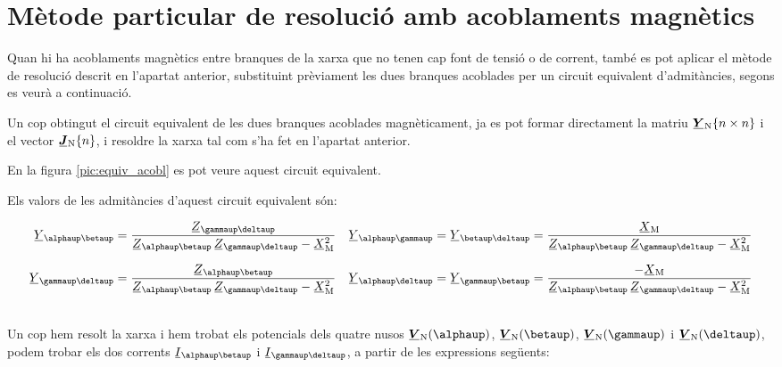 \section{Mètode particular de resolució amb acoblaments magnètics}

Quan hi ha acoblaments magnètics entre branques de la xarxa que no
tenen cap font de tensió o de corrent, també es pot aplicar el
mètode de resolució descrit en l'apartat anterior, substituint
prèviament les dues branques acoblades per un circuit equivalent
d'admitàncies, segons es veurà a continuació. 

Un cop obtingut el circuit equivalent de les dues branques acoblades
magnèticament, ja es pot formar directament la matriu $\mcmplx{Y}\ped{N}\{n \times n\}$ i
el vector $\mcmplx{J}\ped{N}\{n\}$, i  resoldre la xarxa tal com s'ha fet en
l'apartat anterior.

En la figura \vref{pic:equiv_acobl} es pot veure aquest circuit
equivalent.
\begin{center}
\centering
   
    \label{pic:equiv_acobl}
\end{center}

Els valors de les admitàncies d'aquest circuit equivalent
són:

\parbox{15cm}
{ \begin{align*}
   \cmplx{Y}_{\alphaup\betaup} &= \frac{\cmplx{Z}_{\gammaup\deltaup}}{\cmplx{Z}_{\alphaup\betaup}\, \cmplx{Z}_{\gammaup\deltaup}-\cmplx{X}\ped{M}^2} &
   \cmplx{Y}_{\alphaup\gammaup} &= \cmplx{Y}_{\betaup\deltaup} = \frac{\cmplx{X}\ped{M}}{\cmplx{Z}_{\alphaup\betaup}\, \cmplx{Z}_{\gammaup\deltaup}-\cmplx{X}\ped{M}^2} \\[1.5ex]
   \cmplx{Y}_{\gammaup\deltaup} &= \frac{\cmplx{Z}_{\alphaup\betaup}}{\cmplx{Z}_{\alphaup\betaup}\, \cmplx{Z}_{\gammaup\deltaup}-\cmplx{X}\ped{M}^2} &
   \cmplx{Y}_{\alphaup\deltaup} &= \cmplx{Y}_{\gammaup\betaup} = \frac{-\cmplx{X}\ped{M}}{\cmplx{Z}_{\alphaup\betaup}\, \cmplx{Z}_{\gammaup\deltaup}-\cmplx{X}\ped{M}^2}
\end{align*} }
\hfill
\parbox{1cm}{\begin{align}\end{align}}

Un cop hem resolt la xarxa i hem trobat els potencials dels quatre
nusos $\mcmplx{V}\ped{N}(\alphaup)$, $\mcmplx{V}\ped{N}(\betaup)$,
$\mcmplx{V}\ped{N}(\gammaup)$ i $\mcmplx{V}\ped{N}(\deltaup)$, podem
trobar els dos corrents $\cmplx{I}_{\alphaup\betaup}$ i
$\cmplx{I}_{\gammaup\deltaup}$, a partir de les expressions següents:

